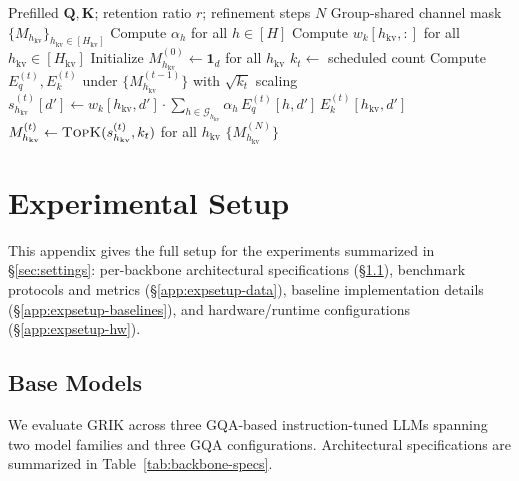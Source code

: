 \documentclass{article}
\begin{document}
\begin{algorithm}[h]
\caption{GRIK channel mask computation}
\label{alg:grik}
\begin{algorithmic}[1]
\Require Prefilled $\mathbf{Q}, \mathbf{K}$; retention ratio $r$; refinement steps $N$
\Ensure Group-shared channel mask $\{M_{h_{\mathrm{kv}}}\}_{h_{\mathrm{kv}} \in [H_{\mathrm{kv}}]}$
\State Compute $\alpha_h$ for all $h \in [H]$ 
\State Compute $w_k[h_{\mathrm{kv}}, :]$ for all $h_{\mathrm{kv}} \in [H_{\mathrm{kv}}]$ 
\State Initialize $M_{h_{\mathrm{kv}}}^{(0)} \gets \mathbf{1}_d$ for all $h_{\mathrm{kv}}$
    \State $k_t \gets$ scheduled count 
    \State Compute $E_q^{(t)}, E_k^{(t)}$ under $\{M_{h_{\mathrm{kv}}}^{(t-1)}\}$ with $\sqrt{k_t}$ scaling
    \State $s_{h_{\mathrm{kv}}}^{(t)}[d'] \gets w_k[h_{\mathrm{kv}}, d'] \cdot \sum_{h \in \mathcal{G}_{h_{\mathrm{kv}}}} \alpha_h \, E_q^{(t)}[h, d'] \, E_k^{(t)}[h_{\mathrm{kv}}, d']$
    \State $M_{h_{\mathrm{kv}}}^{(t)} \gets \textsc{TopK}(s_{h_{\mathrm{kv}}}^{(t)}, k_t)$ for all $h_{\mathrm{kv}}$
\EndFor
\State \Return $\{M_{h_{\mathrm{kv}}}^{(N)}\}$
\end{algorithmic}
\end{algorithm}
 
 
\section{Experimental Setup}
\label{app:expsetup}
 
This appendix gives the full setup for the experiments summarized in \S\ref{sec:settings}: per-backbone architectural specifications (\S\ref{app:expsetup-models}), benchmark protocols and metrics (\S\ref{app:expsetup-data}), baseline implementation details (\S\ref{app:expsetup-baselines}), and hardware/runtime configurations (\S\ref{app:expsetup-hw}).
 
\subsection{Base Models}
\label{app:expsetup-models}
 
We evaluate GRIK across three GQA-based instruction-tuned LLMs spanning two model families and three GQA configurations. Architectural specifications are summarized in Table~\ref{tab:backbone-specs}.
 
\end{document}
